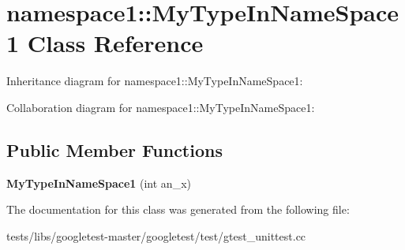 \hypertarget{classnamespace1_1_1MyTypeInNameSpace1}{}\section{namespace1\+:\+:My\+Type\+In\+Name\+Space1 Class Reference}
\label{classnamespace1_1_1MyTypeInNameSpace1}


Inheritance diagram for namespace1\+:\+:My\+Type\+In\+Name\+Space1\+:


Collaboration diagram for namespace1\+:\+:My\+Type\+In\+Name\+Space1\+:
\subsection*{Public Member Functions}
\begin{DoxyCompactItemize}
\item 
\mbox{\label{classnamespace1_1_1MyTypeInNameSpace1_a2e4277aa118e9b83045a18392188a0d8}} 
{\bfseries My\+Type\+In\+Name\+Space1} (int an\+\_\+x)
\end{DoxyCompactItemize}


The documentation for this class was generated from the following file\+:\begin{DoxyCompactItemize}
\item 
tests/libs/googletest-\/master/googletest/test/gtest\+\_\+unittest.\+cc\end{DoxyCompactItemize}
